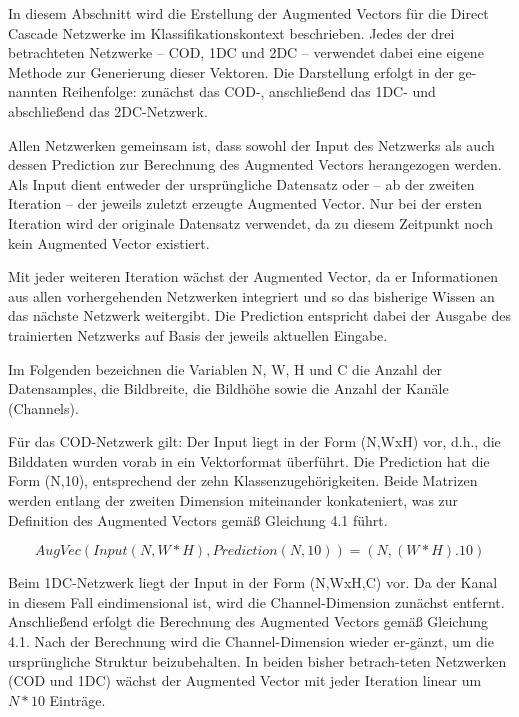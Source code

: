 In diesem Abschnitt wird die Erstellung der Augmented Vectors für die Direct Cascade Netzwerke im Klassifikationskontext beschrieben. Jedes der 
drei betrachteten Netzwerke – COD, 1DC und 2DC – verwendet dabei eine eigene Methode zur Generierung dieser Vektoren. Die Darstellung erfolgt in 
der ge-\\nannten Reihenfolge: zunächst das COD-, anschließend das 1DC- und abschließend das 2DC-Netzwerk.

Allen Netzwerken gemeinsam ist, dass sowohl der Input des Netzwerks als auch dessen Prediction zur Berechnung des Augmented Vectors 
herangezogen werden. Als Input dient entweder der ursprüngliche Datensatz oder – ab der zweiten Iteration – der jeweils zuletzt erzeugte Augmented 
Vector. Nur bei der ersten Iteration wird der originale Datensatz verwendet, da zu diesem Zeitpunkt noch kein Augmented Vector existiert.

Mit jeder weiteren Iteration wächst der Augmented Vector, da er Informationen aus allen vorhergehenden Netzwerken integriert und so das bisherige 
Wissen an das nächste Netzwerk weitergibt. Die Prediction entspricht dabei der Ausgabe des trainierten Netzwerks auf Basis der 
jeweils aktuellen Eingabe.

Im Folgenden bezeichnen die Variablen N, W, H und C die Anzahl der Datensamples, die Bildbreite, die Bildhöhe sowie die Anzahl der Kanäle 
(Channels).

Für das COD-Netzwerk gilt: Der Input liegt in der Form (N,WxH) vor, d.h., die Bilddaten wurden vorab in ein Vektorformat 
überführt. Die Prediction hat die Form (N,10), entsprechend der zehn Klassenzugehörigkeiten. Beide Matrizen werden entlang der zweiten 
Dimension miteinander konkateniert, was zur Definition des Augmented Vectors gemäß Gleichung 4.1 führt.

\begin{equation}
    AugVec(Input(N, W*H), Prediction(N, 10)) = (N, (W*H).10)
\end{equation}

Beim 1DC-Netzwerk liegt der Input in der Form (N,WxH,C) vor. Da der Kanal in diesem Fall eindimensional ist, wird die Channel-Dimension 
zunächst entfernt. Anschließend erfolgt die Berechnung des Augmented Vectors gemäß Gleichung 4.1. Nach der Berechnung wird die Channel-Dimension 
wieder er-gänzt, um die ursprüngliche Struktur beizubehalten. In beiden bisher betrach-teten Netzwerken (COD und 1DC) wächst der Augmented Vector 
mit jeder Iteration linear um $N * 10$ Einträge.

